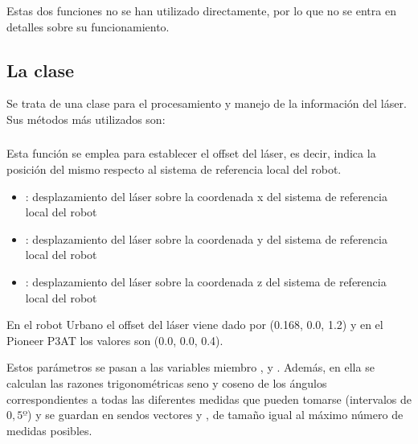 \subsubsection {}
\subsubsection {}

\vspace{0.2cm}
\noindent
Estas dos funciones no se han utilizado directamente, por lo que no se entra en detalles sobre su funcionamiento.

\subsection{La clase }
Se trata de una clase para el procesamiento y manejo de la información del láser. Sus métodos más utilizados son:

\subsubsection {}


\noindent
Esta función se emplea para establecer el offset del láser, es decir, indica la posición del mismo respecto al sistema de referencia local del robot.

\begin{itemize}
  \item {}: desplazamiento del láser sobre la coordenada x del sistema de referencia local del robot
  \item {}: desplazamiento del láser sobre la coordenada y del sistema de referencia local del robot
  \item {}: desplazamiento del láser sobre la coordenada z del sistema de referencia local del robot
\end{itemize}

\noindent
En el robot Urbano el offset del láser viene dado por (0.168, 0.0, 1.2) y en el Pioneer P3AT los valores son (0.0, 0.0, 0.4).

Estos parámetros se pasan a las variables miembro ,  y . Además, en ella se calculan las razones trigonométricas seno y coseno de los ángulos correspondientes a todas las diferentes medidas que pueden tomarse (intervalos de $0,5º$) y se guardan en sendos vectores  y , de tamaño igual al máximo número de medidas posibles.

